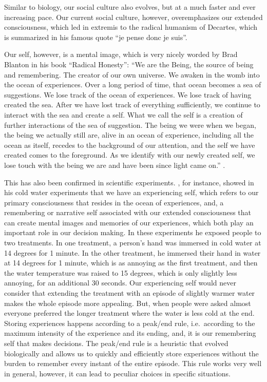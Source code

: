 \documentclass[
  11pt,
]{book}
\begin{document}
Similar to biology, our social culture also evolves, but at a much faster and ever increasing pace.
Our current social culture, however, overemphasizes our extended consciousness, which led in extremis to the radical humanism of Decartes, which is summarized in his famous quote ``je pense donc je suis''.

Our self, however, is a mental image, which is very nicely worded by Brad Blanton in his book ``Radical Honesty'': ``We are the Being, the source of being and remembering. The creator of our own universe. We awaken in the womb into the ocean of experiences. Over a long period of time, that ocean becomes a sea of suggestions. We lose track of the ocean of experiences. We lose track of having created the sea. After we have lost track of everything sufficiently, we continue to interact with the sea and create a self. What we call the self is a creation of further interactions of the sea of suggestion. The being we were when we began, the being we actually still are, alive in an ocean of experience, including all the ocean as itself, recedes to the background of our attention, and the self we have created comes to the foreground. As we identify with our newly created self, we lose touch with the being we are and have been since light came on.'' \citep{Blanton1996}.

This has also been confirmed in scientific experiments. \citet{Kahneman2012}, for instance, showed in his cold water experiments that we have an experiencing self, which refers to our primary consciousness that resides in the ocean of experiences, and, a remembering or narrative self associated with our extended consciousness that can create mental images and memories of our experiences, which both play an important role in our decision making. In these experiments he exposed people to two treatments. In one treatment, a person's hand was immersed in cold water at 14 degrees for 1 minute. In the other treatment, he immersed their hand in water at 14 degrees for 1 minute, which is as annoying as the first treatment, and then the water temperature was raised to 15 degrees, which is only slightly less annoying, for an additional 30 seconds. Our experiencing self would never consider that extending the treatment with an episode of slightly warmer water makes the whole episode more appealing. But, when people were asked almost everyone preferred the longer treatment where the water is less cold at the end. Storing experiences happens according to a peak/end rule, i.e.~according to the maximum intensity of the experience and its ending, and, it is our remembering self that makes decisions. The peak/end rule is a heuristic that evolved biologically and allows us to quickly and efficiently store experiences without the burden to remember every instant of the entire episode. This rule works very well in general, however, it can lead to peculiar choices in specific situations.
\end{document}
